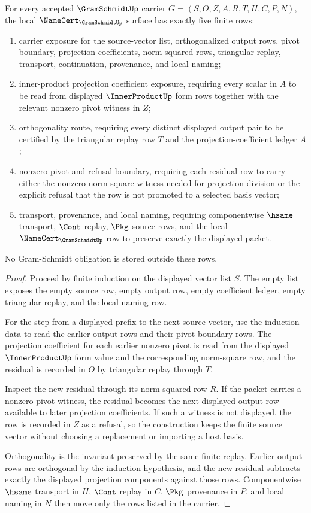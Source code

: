 \begin{theorem}
\label{thm:gram-schmidt-namecert-obligation-surface}
For every accepted $\GramSchmidtUp$ carrier $G=(S,O,Z,A,R,T,H,C,P,N)$, the local $\NameCert_{\GramSchmidtUp}$ surface has exactly five finite rows:
\begin{enumerate}
\item carrier exposure for the source-vector list, orthogonalized output rows, pivot boundary, projection coefficients, norm-squared rows, triangular replay, transport, continuation, provenance, and local naming;
\item inner-product projection coefficient exposure, requiring every scalar in $A$ to be read from displayed $\InnerProductUp$ form rows together with the relevant nonzero pivot witness in $Z$;
\item orthogonality route, requiring every distinct displayed output pair to be certified by the triangular replay row $T$ and the projection-coefficient ledger $A$;
\item nonzero-pivot and refusal boundary, requiring each residual row to carry either the nonzero norm-square witness needed for projection division or the explicit refusal that the row is not promoted to a selected basis vector;
\item transport, provenance, and local naming, requiring componentwise $\hsame$ transport, $\Cont$ replay, $\Pkg$ source rows, and the local $\NameCert_{\GramSchmidtUp}$ row to preserve exactly the displayed packet.
\end{enumerate}
No Gram-Schmidt obligation is stored outside these rows.
\end{theorem}
\begin{proof}
Proceed by finite induction on the displayed vector list $S$. The empty list exposes the empty source row, empty output row, empty coefficient ledger, empty triangular replay, and the local naming row.

For the step from a displayed prefix to the next source vector, use the induction data to read the earlier output rows and their pivot boundary rows. The projection coefficient for each earlier nonzero pivot is read from the displayed $\InnerProductUp$ form value and the corresponding norm-square row, and the residual is recorded in $O$ by triangular replay through $T$.

Inspect the new residual through its norm-squared row $R$. If the packet carries a nonzero pivot witness, the residual becomes the next displayed output row available to later projection coefficients. If such a witness is not displayed, the row is recorded in $Z$ as a refusal, so the construction keeps the finite source vector without choosing a replacement or importing a host basis.

Orthogonality is the invariant preserved by the same finite replay. Earlier output rows are orthogonal by the induction hypothesis, and the new residual subtracts exactly the displayed projection components against those rows. Componentwise $\hsame$ transport in $H$, $\Cont$ replay in $C$, $\Pkg$ provenance in $P$, and local naming in $N$ then move only the rows listed in the carrier.
\end{proof}

